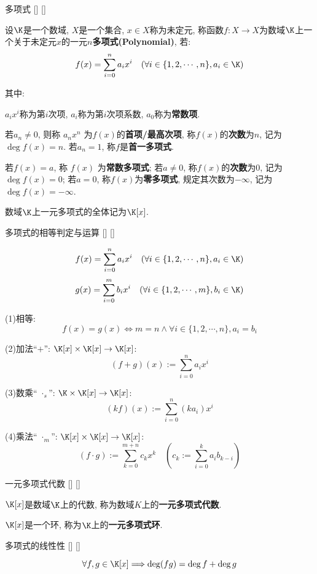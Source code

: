 \documentclass[UTF8]{ctexart}
\begin{document}
		\begin{dfn}
			[]
			{多项式}
			[]
			[]

			设$\K$是一个数域, $X$是一个集合, $x\in X$称为未定元, 称函数$f:X\to X$为数域$\K$上一个关于未定元$x$的一元$n$\textbf{多项式(Polynomial)}, 若: 
			\[f(x)=\sum_{i=0}^n a_i x^i\quad(\forall i\in\{1,2,\cdots,n\}, a_i\in\K)\]

			其中: 
			
			$a_i x^i$称为第$i$次项, $a_i$称为第$i$次项系数, $a_0$称为\textbf{常数项}. 

			若$a_n\neq 0$, 则称 $a_n x^n$ 为$f(x)$的\textbf{首项/最高次项}, 称$f(x)$的\textbf{次数}为$n$, 记为$\deg f(x)=n$. 若$a_n=1$, 称$f$是\textbf{首一多项式}. 

			若$f(x)=a$, 称 $f(x)$ 为\textbf{常数多项式}; 若$a\neq 0$, 称$f(x)$的\textbf{次数}为$0$, 记为$\deg f(x)=0$; 若$a=0$, 称$f(x)$为\textbf{零多项式}, 规定其次数为$-\infty$, 记为$\deg f(x)=-\infty$. 

			数域$\K$上一元多项式的全体记为$\K[x]$. 
		\end{dfn}
		
		\begin{dfn}
			[]
			{多项式的相等判定与运算}
			[]
			[]

			\[f(x)=\sum_{i=0}^n a_i x^i\quad(\forall i\in\{1,2,\cdots,n\}, a_i\in\K)\]
			\[g(x)=\sum_{i=0}^m b_i x^i\quad(\forall i\in\{1,2,\cdots,m\}, b_i\in\K)\]
			
			(1)相等: 
			\[f(x)=g(x)\iff m=n\wedge\forall i\in\{1,2,\cdots,n\}, a_i=b_i\]

			(2)加法``$+$'': $\K[x]\times\K[x]\to\K[x]$: 
			\[(f+g)(x):=\sum_{i=0}^n a_i x^i\]

			(3)数乘`` $\cdot_s$'': $\K\times\K[x]\to\K[x]$: 
			\[(kf)(x):=\sum_{i=0}^n (ka_i) x^i\]

			(4)乘法`` $\cdot_m$'': $\K[x]\times\K[x]\to\K[x]$: 
			\[(f\cdot g):=\sum_{k=0}^{m+n} c_k x^k\quad\left(c_k:=\sum_{i=0}^k a_i b_{k-i}\right)\]
		\end{dfn}
		
		\begin{ppt}
			[]
			{一元多项式代数}
			[]
			[]

			$\K[x]$是数域$\K$上的代数, 称为数域$K$上的\textbf{一元多项式代数}. 

			$\K[x]$是一个环, 称为$\K$上的\textbf{一元多项式环}. 
		\end{ppt}
		
		\begin{ppt}
			[]
			{多项式的线性性}
			[]
			[]

			\[\forall f,g\in\K[x]\Longrightarrow\deg(fg)=\deg f+\deg g\]
		\end{ppt}
  
\end{document}
